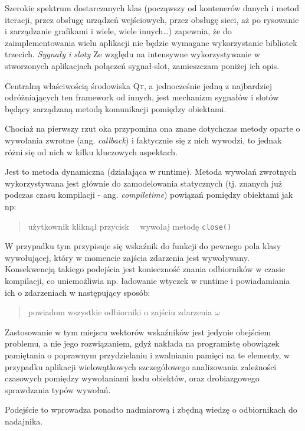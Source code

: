 Szerokie spektrum dostarczanych klas (począwszy od kontenerów danych i metod iteracji, przez obsługę urządzeń wejściowych, przez obsługę sieci, aż po rysowanie i zarządzanie grafikami i wiele, wiele innych\ldots) zapewnia, że do zaimplementowania wielu aplikacji nie będzie wymagane wykorzystanie bibliotek trzecich.
\newline
\newline
\textsl{Sygnały i sloty}
Ze względu na intensywne wykorzystywanie w stworzonych aplikacjach połączeń sygnał-slot, zamieszczam poniżej ich opis.

Centralną właściwością środowiska \textsc{Qt}, a jednocześnie jedną z najbardziej odróżniających ten framework od innych, jest mechanizm sygnałów i slotów będący zarządzaną metodą komunikacji pomiędzy obiektami.

Chociaż na pierwszy rzut oka przypomina ona znane dotychczas metody oparte o wywołania zwrotne (ang. \textsl{callback}) i faktycznie się z nich wywodzi, to jednak różni się od nich w kilku kluczowych aspektach.

Jest to metoda dynamiczna (działająca w runtime). Metoda wywołań zwrotnych wykorzystywana jest głównie do zamodelowania statycznych (tj. znanych już podczas czasu kompilacji - ang. \textsl{compiletime}) powiązań pomiędzy obiektami jak np:
\begin{verse}
użytkownik kliknął przycisk \texttimes~\textrightarrow~wywołaj metodę \texttt{close()}
\end{verse}

W przypadku tym przypisuje się wskaźnik do funkcji do pewnego pola klasy wywołującej, który w momencie zajścia zdarzenia jest wywoływany. Konsekwencją takiego podejścia jest konieczność znania odbiorników w czasie kompilacji, co uniemożliwia np. ładowanie wtyczek w runtime i powiadamiania ich o zdarzeniach w następujący sposób:
\begin{verse}
powiadom wszystkie odbiorniki o zajściu zdarzenia $\omega$
\end{verse}

Zastosowanie w tym miejscu wektorów wskaźników jest jedynie obejściem problemu, a nie jego rozwiązaniem, gdyż nakłada na programistę obowiązek pamiętania o poprawnym przydzielaniu i zwalnianiu pamięci na te elementy, w przypadku aplikacji wielowątkowych szczegółowego analizowania zależności czasowych pomiędzy wywołaniami kodu obiektów, oraz drobiazgowego sprawdzania typów wywołań.

Podejście to wprowadza ponadto nadmiarową i zbędną wiedzę o odbiornikach do nadajnika.

